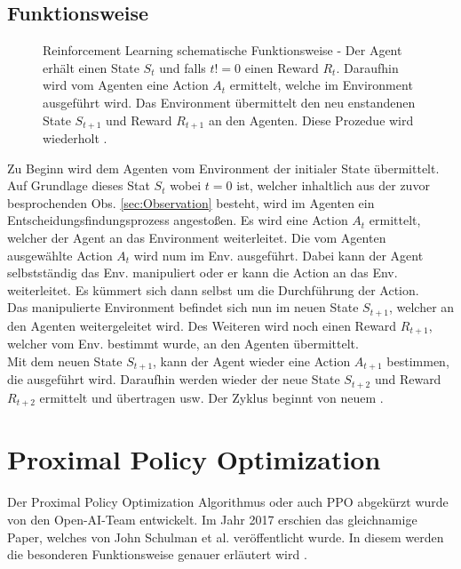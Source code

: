 \subsection{Funktionsweise}
\begin{figure}[H]
	\centering
	\def\svgscale{1.0}
	
	\caption[Reinforcement Learning]{Reinforcement Learning schematische Funktionsweise - Der Agent erhält einen State $S_{t}$ und falls $t \mathrel{{!}{=}} 0$ einen Reward $R_{t}$. Daraufhin wird vom Agenten eine Action $A_{t}$ ermittelt, welche im Environment ausgeführt wird. Das Environment übermittelt den neu enstandenen State $S_{t+1}$ und Reward $R_{t+1}$ an den Agenten. Diese Prozedue wird wiederholt \cite{Sutton1998}.}
	\label{fig:Reinforcement Learning}
\end{figure}
Zu Beginn wird dem Agenten vom Environment der initialer State übermittelt. Auf Grundlage dieses Stat $S_{t}$ wobei $t=0$ ist, welcher inhaltlich aus der zuvor besprochenden Obs. \ref{sec:Observation} besteht, wird im Agenten ein Entscheidungsfindungsprozess angestoßen. Es wird eine Action $A_{t}$ ermittelt, welcher der Agent an das Environment weiterleitet. Die vom Agenten ausgewählte Action $A_{t}$ wird num im Env. ausgeführt. Dabei kann der Agent selbstständig das Env. manipuliert oder er kann die Action an das Env. weiterleitet. Es kümmert sich dann  selbst um die Durchführung der Action.\\
Das manipulierte Environment befindet sich nun im neuen State $S_{t+1}$, welcher an den Agenten weitergeleitet wird. Des Weiteren wird noch einen Reward $R_{t+1}$, welcher vom Env. bestimmt wurde, an den Agenten übermittelt.\\ 
Mit dem neuen State $S_{t+1}$, kann der Agent wieder eine Action $A_{t+1}$ bestimmen, die ausgeführt wird. Daraufhin werden wieder der neue State $S_{t+2}$ und Reward $R_{t+2}$ ermittelt und übertragen usw. Der Zyklus beginnt von neuem \cite{Sutton1998}.

\section{Proximal Policy Optimization}
Der Proximal Policy Optimization Algorithmus oder auch PPO abgekürzt wurde von den Open-AI-Team entwickelt. Im Jahr 2017 erschien das gleichnamige Paper, welches von John Schulman et al. veröffentlicht wurde. In diesem werden die besonderen Funktionsweise genauer erläutert wird \cite{PPO}.
